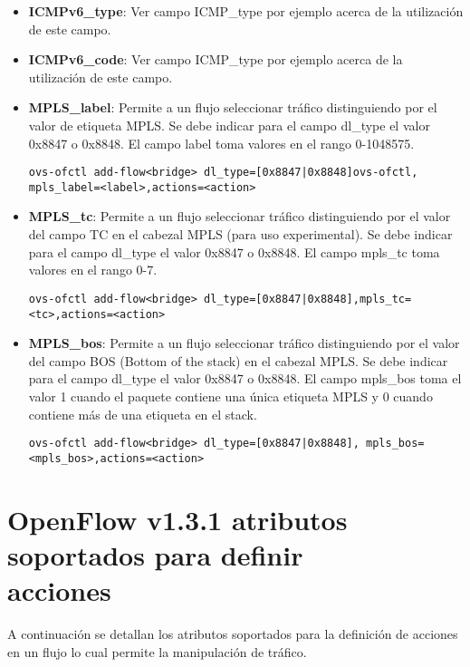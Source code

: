 \begin{itemize}
\item \textbf{ICMPv6\_type}: Ver campo ICMP\_type por ejemplo acerca de la utilización de este campo. 

\item \textbf{ICMPv6\_code}: Ver campo ICMP\_type por ejemplo acerca de la utilización de este campo. 

\item \textbf{MPLS\_label}:  Permite a un flujo seleccionar tr\'afico distinguiendo por el valor de etiqueta MPLS. Se debe indicar para el campo dl\_type el valor 0x8847 o 0x8848. El campo label toma valores en el rango 0-1048575.

\begin{center}
\texttt{ovs-ofctl add-flow<bridge> dl\_type=[0x8847|0x8848]ovs-ofctl, mpls\_label=<label>,actions=<action>}
\end{center}

\item \textbf{MPLS\_tc}: Permite a un flujo seleccionar tr\'afico distinguiendo por el valor del campo TC en el cabezal MPLS (para uso experimental). Se debe indicar para el campo dl\_type el valor 0x8847 o 0x8848. El campo mpls\_tc toma valores en el rango 0-7.

\begin{center}
\texttt{ovs-ofctl add-flow<bridge> dl\_type=[0x8847|0x8848],mpls\_tc=<tc>,actions=<action>}
\end{center}

\item \textbf{MPLS\_bos}: Permite a un flujo seleccionar tr\'afico distinguiendo por el valor del campo BOS (Bottom of the stack) en el cabezal MPLS. Se debe indicar para el campo dl\_type el valor 0x8847 o 0x8848. El campo mpls\_bos toma el valor 1 cuando el paquete contiene una única etiqueta MPLS y 0 cuando contiene m\'as de una etiqueta en el stack.

\begin{center}
\texttt{ovs-ofctl add-flow<bridge> dl\_type=[0x8847|0x8848], mpls\_bos=<mpls\_bos>,actions=<action>}
\end{center}

\end{itemize}

\section{OpenFlow v1.3.1 atributos soportados para definir \\ acciones}
A continuaci\'on se detallan los atributos soportados para la definici\'on de acciones en un flujo lo cual permite la manipulaci\'on de tr\'afico.

